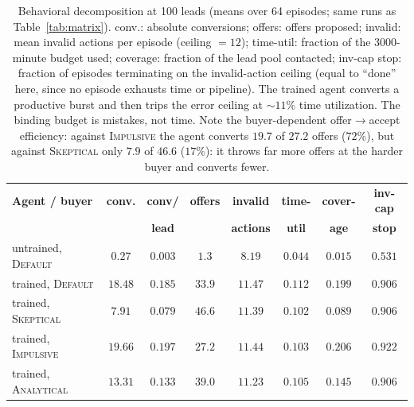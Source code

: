 \documentclass{article} %
\begin{document}
\begin{table}[t]
\centering
\small
\setlength{\tabcolsep}{4pt}
\begin{tabular}{lccccccc}
\toprule
\textbf{Agent / buyer} & \textbf{conv.} & \textbf{conv/} & \textbf{offers} & \textbf{invalid} & \textbf{time-} & \textbf{cover-} & \textbf{inv-cap} \\
 & & \textbf{lead} & & \textbf{actions} & \textbf{util} & \textbf{age} & \textbf{stop} \\
\midrule
untrained, \textsc{Default}  & $0.27$  & $0.003$ & $1.3$  & $8.19$  & $0.044$ & $0.015$ & $0.531$ \\
trained, \textsc{Default}    & $18.48$ & $0.185$ & $33.9$ & $11.47$ & $0.112$ & $0.199$ & $0.906$ \\
trained, \textsc{Skeptical}  & $7.91$  & $0.079$ & $46.6$ & $11.39$ & $0.102$ & $0.089$ & $0.906$ \\
trained, \textsc{Impulsive}  & $19.66$ & $0.197$ & $27.2$ & $11.44$ & $0.103$ & $0.206$ & $0.922$ \\
trained, \textsc{Analytical} & $13.31$ & $0.133$ & $39.0$ & $11.23$ & $0.105$ & $0.145$ & $0.906$ \\
\bottomrule
\end{tabular}
\caption{Behavioral decomposition at 100 leads (means over 64 episodes; same runs as Table~\ref{tab:matrix}).
conv.: absolute conversions; offers: offers proposed; invalid: mean invalid actions per episode (ceiling $=12$);
time-util: fraction of the 3000-minute budget used; coverage: fraction of the lead pool contacted; inv-cap stop:
fraction of episodes terminating on the invalid-action ceiling (equal to ``done'' here, since no episode exhausts
time or pipeline). The trained agent converts a productive burst and then trips the error ceiling at ${\sim}11\%$
time utilization. The binding budget is mistakes, not time. Note the buyer-dependent offer$\rightarrow$accept
efficiency: against \textsc{Impulsive} the agent converts $19.7$ of $27.2$ offers ($72\%$), but against
\textsc{Skeptical} only $7.9$ of $46.6$ ($17\%$): it throws far more offers at the harder buyer and converts fewer.}
\label{tab:behavior}
\end{table}
\end{document}
